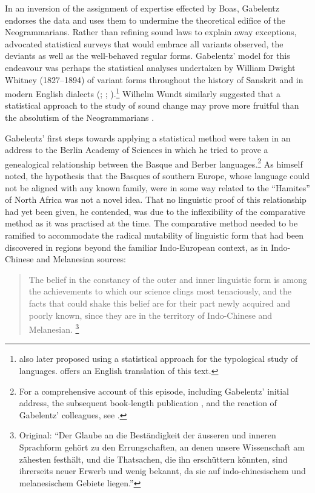 \documentclass[output=paper]{langscibook}
\begin{document}
In an inversion of the assignment of expertise effected by Boas, Gabelentz endorses the data and uses them to undermine the theoretical edifice of the Neogrammarians. Rather than refining sound laws to explain away exceptions, \citet[198]{Gabelentz20161891} advocated statistical surveys that would embrace all variants observed, the deviants as well as the well-behaved regular forms. Gabelentz' model for this endeavour was perhaps the statistical analyses undertaken by William Dwight Whitney (1827--1894) of variant forms throughout the history of Sanskrit and in modern English dialects (\citealt{Whitney1874}; \citealt{Whitney189618751878}; \citealt[cf.][vix-xx, xxii-xxiii]{Silverstein1971}).\footnote{\citet{Gabelentz1894t} also later proposed using a statistical approach for the typological study of languages. \citet{McElvenny2018typ} offers an English translation of this text.} Wilhelm Wundt similarly suggested that a statistical approach to the study of sound change may prove more fruitful than the absolutism of the Neogrammarians \citep[see][]{Formigari2018}.

Gabelentz' first steps towards applying a statistical method were taken in an \citeyear{Gabelentz1893} address to the Berlin Academy of Sciences in which he tried to prove a genealogical relationship between the Basque and Berber languages.\footnote{For a comprehensive account of this episode, including Gabelentz' initial address, the subsequent book-length publication \citep{Gabelentz1894bb}, and the reaction of Gabelentz' colleagues, see \citet{HurchPurgay2019}.} As \citet[593--594]{Gabelentz1893} himself noted, the hypothesis that the Basques of southern Europe, whose language could not be aligned with any known family, were in some way related to the ``Hamites'' of North Africa was not a novel idea. That no linguistic proof of this relationship had yet been given, he contended, was due to the inflexibility of the comparative method as it was practised at the time. The comparative method needed to be ramified to accommodate the radical mutability of linguistic form that had been discovered in regions beyond the familiar Indo-European context, as in Indo-Chinese and Melanesian sources:

\begin{quotation}
The belief in the constancy of the outer and inner linguistic form is among the achievements to which our science clings most tenaciously, and the facts that could shake this belief are for their part newly acquired and poorly known, since they are in the territory of Indo-Chinese and Melanesian. \citep[594]{Gabelentz1893}\footnote{Original: ``Der Glaube an die Beständigkeit der äusseren und inneren Sprachform gehört zu den Errungschaften, an denen unsere Wissenschaft am zähesten festhält, und die Thatsachen, die ihn erschüttern könnten, sind ihrerseits neuer Erwerb und wenig bekannt, da sie auf indo-chinesischem und melanesischem Gebiete liegen.''}
\end{quotation}
\end{document}

